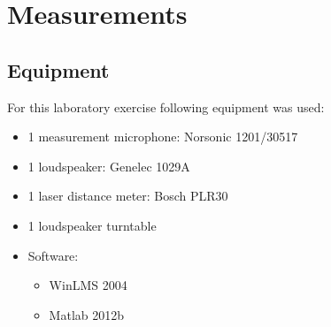 \documentclass{article}
\begin{document}
\section{Measurements}
\subsection{Equipment}
For this laboratory exercise following equipment was used:
\begin{itemize}
\item 1 measurement microphone: Norsonic 1201/30517
\item 1 loudspeaker: Genelec 1029A
\item 1 laser distance meter: Bosch PLR30
\item 1 loudspeaker turntable
\item Software:
\begin{itemize}
\item WinLMS 2004
\item Matlab 2012b
\end{itemize}
\end{itemize}
\end{document}
